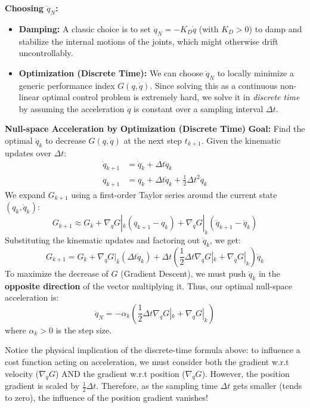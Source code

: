 \documentclass[11pt,a4paper]{article}
\begin{document}
\textbf{Choosing $\ddot{q}_N$:} 
\begin{itemize}
    \item \textbf{Damping:} A classic choice is to set $\ddot{q}_N = -K_D \dot{q}$ (with $K_D > 0$) to damp and stabilize the internal motions of the joints, which might otherwise drift uncontrollably.
    \item \textbf{Optimization (Discrete Time):} We can choose $\ddot{q}_N$ to locally minimize a generic performance index $G(q, \dot{q})$. Since solving this as a continuous non-linear optimal control problem is extremely hard, we solve it in \textit{discrete time} by assuming the acceleration $\ddot{q}$ is constant over a sampling interval $\Delta t$.
\end{itemize}

\textbf{Null-space Acceleration by Optimization (Discrete Time)}
\textbf{Goal:} Find the optimal $\ddot{q}_k$ to decrease $G(q, \dot{q})$ at the next step $t_{k+1}$.
Given the kinematic updates over $\Delta t$:
\begin{align*}
    \dot{q}_{k+1} &= \dot{q}_k + \Delta t \ddot{q}_k \\
    q_{k+1} &= q_k + \Delta t \dot{q}_k + \frac{1}{2} \Delta t^2 \ddot{q}_k
\end{align*}
We expand $G_{k+1}$ using a first-order Taylor series around the current state $(q_k, \dot{q}_k)$:
$$G_{k+1} \approx G_k + \nabla_q G|_k (q_{k+1} - q_k) + \nabla_{\dot{q}} G|_k (\dot{q}_{k+1} - \dot{q}_k)$$
Substituting the kinematic updates and factoring out $\ddot{q}_k$, we get:
$$G_{k+1} = G_k + \nabla_q G|_k (\Delta t \dot{q}_k) + \Delta t \left( \frac{1}{2} \Delta t \nabla_q G|_k + \nabla_{\dot{q}} G|_k \right) \ddot{q}_k$$
To maximize the decrease of $G$ (Gradient Descent), we must push $\ddot{q}_k$ in the \textbf{opposite direction} of the vector multiplying it. Thus, our optimal null-space acceleration is:
\begin{equation}
    \ddot{q}_N = -\alpha_k \left( \frac{1}{2} \Delta t \nabla_q G|_k + \nabla_{\dot{q}} G|_k \right)
\end{equation}
where $\alpha_k > 0$ is the step size.
 

\begin{examtip}
Notice the physical implication of the discrete-time formula above: to influence a cost function acting on acceleration, we must consider both the gradient w.r.t velocity ($\nabla_{\dot{q}} G$) AND the gradient w.r.t position ($\nabla_q G$). However, the position gradient is scaled by $\frac{1}{2}\Delta t$. Therefore, as the sampling time $\Delta t$ gets smaller (tends to zero), the influence of the position gradient vanishes!
\end{examtip}
\end{document}

